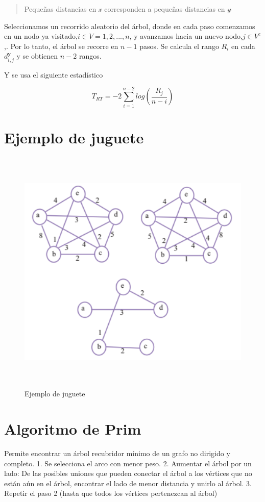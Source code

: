 \documentclass[]{book}
\begin{document}
\begin{quote}
Pequeñas distancias en \(\mathcal{x}\) corresponden a pequeñas
distancias en \(\mathcal{y}\)
\end{quote}

Seleccionamos un recorrido aleatorio del árbol, donde en cada paso
comenzamos en un nodo ya visitado,\(i \in V= {1,2,...,n}\), y avanzamos
hacia un nuevo nodo,\(j \in V^c\),. Por lo tanto, el árbol se recorre en
\(n-1\) pasos. Se calcula el rango \(R_i\) en cada
\(d_{i,j}^{\mathbf{y}}\) y se obtienen \(n-2\) rangos.

Y se usa el siguiente estadístico

\[T_{RT} =  -2 \displaystyle \sum_{i=1}^{n-2} log(\dfrac{R_j}{n-i})\]

\section{Ejemplo de juguete}\label{ejemplo-de-juguete}

\begin{figure}

{\centering \includegraphics[width=500,height=450]{test6} 

}

\caption{Ejemplo de juguete}\label{fig:unnamed-chunk-9}
\end{figure}

\section{Algoritmo de Prim}\label{algoritmo-de-prim}

Permite encontrar un árbol recubridor mínimo de un grafo no dirigido y
completo. 1. Se selecciona el arco con menor peso. 2. Aumentar el árbol
por un lado: De las posibles uniones que pueden conectar el árbol a los
vértices que no están aún en el árbol, encontrar el lado de menor
distancia y unirlo al árbol. 3. Repetir el paso 2 (hasta que todos los
vértices pertenezcan al árbol) \citep{heller2012consistent}
\end{document}
